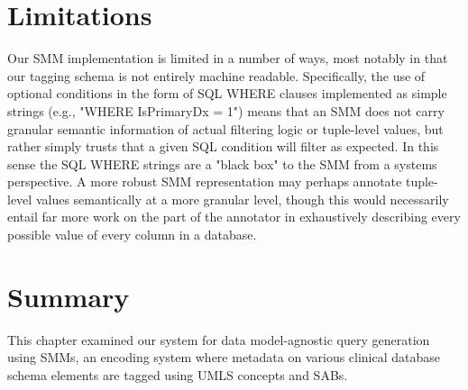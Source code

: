 \documentclass[../main.tex]{subfiles}
\begin{document}
\section{Limitations}

Our SMM implementation is limited in a number of ways, most notably in that our tagging schema is not entirely machine readable. Specifically, the use of optional conditions in the form of SQL WHERE clauses implemented as simple strings (e.g., "WHERE IsPrimaryDx = 1") means that an SMM does not carry granular semantic information of actual filtering logic or tuple-level values, but rather simply trusts that a given SQL condition will filter as expected. In this sense the SQL WHERE strings are a "black box" to the SMM from a systems perspective. A more robust SMM representation may perhaps annotate tuple-level values semantically at a more granular level, though this would necessarily entail far more work on the part of the annotator in exhaustively describing every possible value of every column in a database.

\section{Summary}

This chapter examined our system for data model-agnostic query generation using SMMs, an encoding system where metadata on various clinical database schema elements are tagged using UMLS concepts and SABs. 
\end{document}
